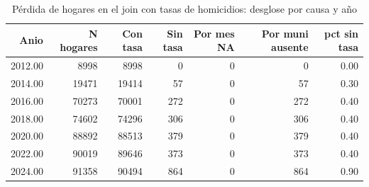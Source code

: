 \begin{table}[ht]
\centering
\caption{P\'erdida de hogares en el join con tasas de homicidios: desglose por causa y a\~{n}o} 
\label{tab:09_perdida_join_tasa}
\begin{tabular}{rrrrrrr}
  \toprule
Anio & N hogares & Con tasa & Sin tasa & Por mes NA & Por muni ausente & pct sin tasa \\ 
  \midrule
2012.00 & 8998 & 8998 &   0 &   0 &   0 & 0.00 \\ 
  2014.00 & 19471 & 19414 &  57 &   0 &  57 & 0.30 \\ 
  2016.00 & 70273 & 70001 & 272 &   0 & 272 & 0.40 \\ 
  2018.00 & 74602 & 74296 & 306 &   0 & 306 & 0.40 \\ 
  2020.00 & 88892 & 88513 & 379 &   0 & 379 & 0.40 \\ 
  2022.00 & 90019 & 89646 & 373 &   0 & 373 & 0.40 \\ 
  2024.00 & 91358 & 90494 & 864 &   0 & 864 & 0.90 \\ 
   \bottomrule
\end{tabular}
\end{table}
